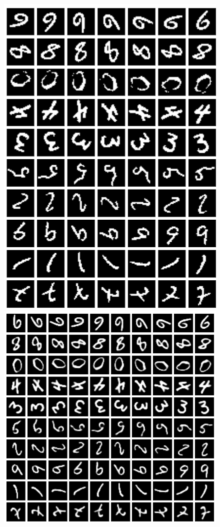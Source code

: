 \begin{frame}
\begin{figure}[h!]
\begin{minipage}{0.33\textwidth}
			\includegraphics[scale=0.19]{Bilder/MNISTorig2}
	\end{minipage}
	\begin{minipage}{0.33\textwidth}
			\center{}
			\includegraphics[scale=0.19]{Bilder/MNISTrec}

\end{minipage}
\end{figure}
\end{frame}
